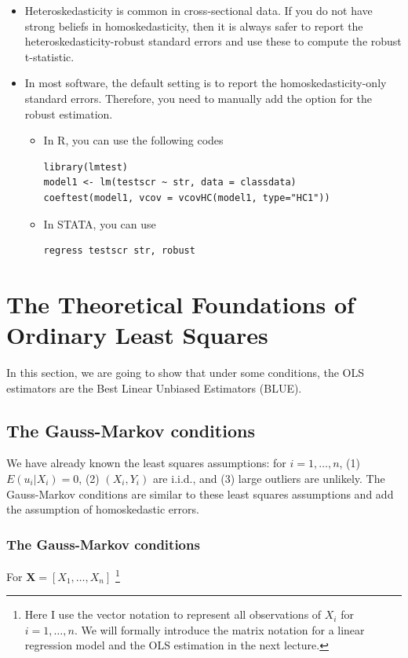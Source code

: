 \documentclass[a4paper,11pt]{article}
\begin{document}
\begin{itemize}
\item Heteroskedasticity is common in cross-sectional data. If you do not
have strong beliefs in homoskedasticity, then it is always safer to
report the heteroskedasticity-robust standard errors and use these
to compute the robust t-statistic.
\item In most software, the default setting is to report the
homoskedasticity-only standard errors. Therefore, you need to
manually add the option for the robust estimation. 

\begin{itemize}
\item In R, you can use the following codes
\begin{verbatim}
library(lmtest)
model1 <- lm(testscr ~ str, data = classdata)
coeftest(model1, vcov = vcovHC(model1, type="HC1"))
\end{verbatim}

\item In STATA, you can use
\begin{verbatim}
regress testscr str, robust
\end{verbatim}
\end{itemize}
\end{itemize}


\section{The Theoretical Foundations of Ordinary Least Squares}
\label{sec:org4d237e1}

In this section, we are going to show that under some conditions, the
OLS estimators are the Best Linear Unbiased Estimators (BLUE). 

\subsection{The Gauss-Markov conditions}
\label{sec:org7cfa423}

We have already known the least squares assumptions: for \(i = 1,
\ldots, n\), (1) \(E(u_i|X_i) = 0\), (2) \((X_i, Y_i)\) are i.i.d., and (3)
large outliers are unlikely. The Gauss-Markov conditions are similar
to these least squares assumptions and add the assumption of
homoskedastic errors.

\subsubsection*{The Gauss-Markov conditions}
\label{sec:org5d59140}
For \(\mathbf{X} = [X_1, \ldots, X_n]\) \footnote{Here I use the vector
notation to represent all observations of \(X_i\) for \(i=1, \ldots,
n\). We will formally introduce the matrix notation for a linear
regression model and the OLS estimation in the next lecture.}
\end{document}
